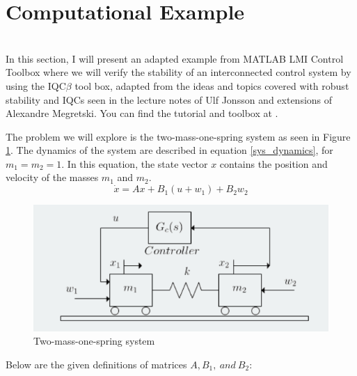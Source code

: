\documentclass{article}[12pt]
\begin{document}
\section{Computational Example}




\\

In this section, I will present an adapted example from MATLAB LMI Control Toolbox where we will verify the stability of an interconnected control system by using the IQC$\beta$ tool box, adapted from the ideas and topics covered with robust stability and IQCs seen in the lecture notes of Ulf Jonsson \cite{Ulf_lecture} and extensions of Alexandre Megretski. You can find the tutorial and toolbox at \cite{toolbox}.  



The problem we will explore is the two-mass-one-spring system as seen in Figure \ref{spring_sys}. The dynamics of the system are described in equation \ref{sys_dynamics}, for $m_1 = m_2 = 1$. In this equation, the state vector $x$ contains the position and velocity of the masses $m_1$
 and $m_2$.
\begin{equation}
    \label{sys_dynamics}
    \Dot{x} = Ax + B_1(u+w_1) + B_2 w_2
\end{equation}

\begin{figure}[h]
    \centering
    \includegraphics[width=.5\linewidth]{images/2_mass_1_spring.PNG}
    \caption{Two-mass-one-spring system}
    \label{spring_sys}
\end{figure}

\noindent Below are the given definitions of matrices $A,B_1,\: and \: B_2$:
\end{document}
